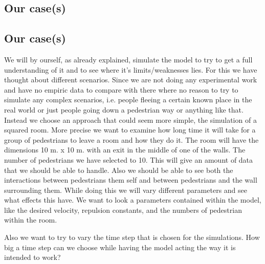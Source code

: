 \subsection{Our case(s)}


\subsection{Our case(s)}
We will by ourself, as already explained, simulate the model to try to get a full understanding of it and to see where it's limits/weaknesses lies. For this we have thought about different scenarios. Since we are not doing any experimental work and have no empiric data to compare with there where no reason to try to simulate any complex scenarios, i.e. people fleeing a certain known place in the real world or just people going down a pedestrian way or anything like that. Instead we choose an approach that could seem more simple, the simulation of a squared room. More precise we want to examine how long time it will take for a group of pedestrians to leave a room and how they do it. The room will have the dimensions 10 m. x 10 m. with an exit in the middle of one of the walls. The number of pedestrians we have selected to 10. This will give an amount of data that we should be able to handle. Also we should be able to see both the interactions between pedestrians them self and between pedestrians and the wall surrounding them.  While doing this we will vary different parameters and see what effects this have. We want to look a parameters contained within the model, like the desired velocity, repulsion constants, and the numbers of pedestrian within the room. 

Also we want to try to vary the time step that is chosen for the simulations. How big a time step can we choose while having the model acting the way it is intended to work?


